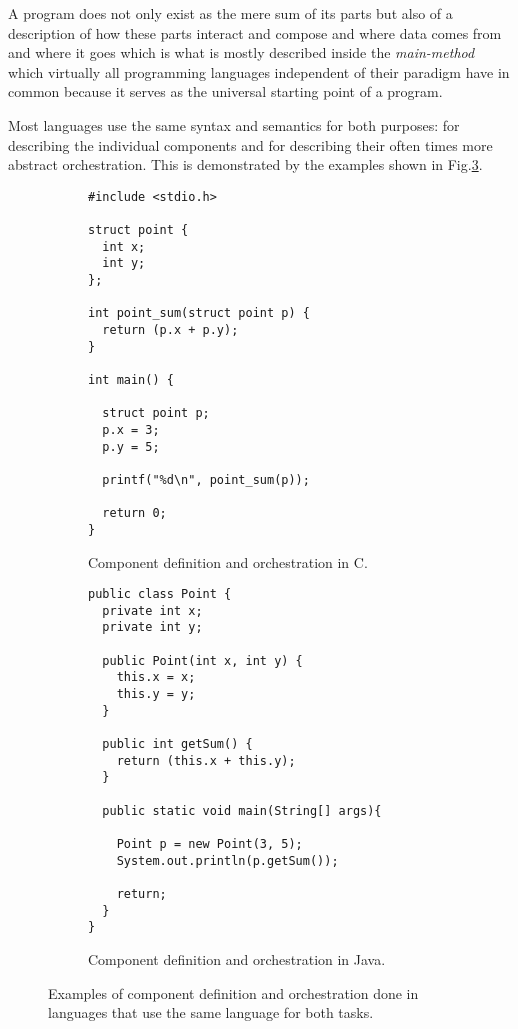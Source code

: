 A program does not only exist as the mere sum of its parts but
also of a description of how these parts interact and compose and
where data comes from and where it goes which is what is mostly
described inside the \textit{main-method} which virtually
all programming languages independent of their paradigm have in
common because it serves as the universal starting point of a program.

Most languages use the same syntax and semantics
for both purposes: for describing the individual components and for
describing their often times more abstract orchestration.
This is demonstrated by the examples shown in Fig.\ref{c-and-java}.

\begin{figure}[h!]
    \vspace{5mm}
    \begin{subfigure}[b]{0.41\textwidth}

    \begin{lstlisting}
#include <stdio.h>

struct point {
  int x;
  int y;
};

int point_sum(struct point p) {
  return (p.x + p.y);
}

int main() {

  struct point p;
  p.x = 3;
  p.y = 5;

  printf("%d\n", point_sum(p));

  return 0;
}
    \end{lstlisting}

      \caption{Component definition and orchestration in C.}
      \label{fig:c-example}
    \end{subfigure}
    \hfill
    \vspace{10pt}
    \begin{subfigure}[b]{0.54\textwidth}

    \begin{lstlisting}
public class Point {
  private int x;
  private int y;

  public Point(int x, int y) {
    this.x = x;
    this.y = y;
  }

  public int getSum() {
    return (this.x + this.y);
  }

  public static void main(String[] args){

    Point p = new Point(3, 5);
    System.out.println(p.getSum());

    return;
  }
}
    \end{lstlisting}

      \caption{Component definition and orchestration in Java.}
      \label{fig:java-example}
    \end{subfigure}

  \caption{Examples of component definition and orchestration done in
           languages that use the same language for both tasks.}
  \label{c-and-java}

\end{figure}

